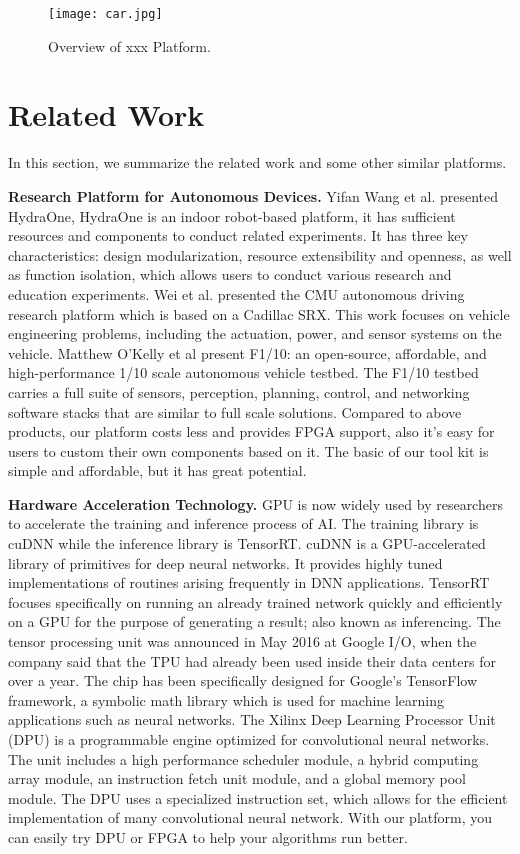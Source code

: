 \documentclass[conference]{IEEEtran}
\begin{document}
\begin{sloppypar}
\begin{figure}[htbp]
\centerline{\texttt{[image: car.jpg]}}
\caption{Overview of xxx Platform.}
\label{ov}
\end{figure}

\section{Related Work}

In this section, we summarize the related work and some other similar platforms.

\textbf{Research Platform for Autonomous Devices.} Yifan Wang et al. presented HydraOne\cite{b9}, HydraOne is an indoor robot-based platform, it has sufficient resources and components to conduct related experiments. It has three key characteristics: design modularization, resource extensibility and openness, as well as function isolation, which allows users to conduct various research and education experiments. Wei et al. presented the CMU autonomous driving research platform which is based on a Cadillac SRX\cite{b10}. This work focuses on vehicle engineering problems, including the actuation, power, and sensor systems on the vehicle. Matthew O’Kelly et al present F1/10\cite{b11}: an open-source, affordable, and high-performance 1/10 scale autonomous vehicle testbed. The F1/10 testbed carries a full suite of sensors, perception, planning, control, and networking software stacks that are similar to full scale solutions. Compared to above products, our platform costs less and provides FPGA support, also it's easy for users to custom their own components based on it. The basic of our tool kit is simple and affordable, but it has great potential.

\textbf{Hardware Acceleration Technology.} GPU\cite{b12} is now widely used by researchers to accelerate the training and inference process of AI. The training library is cuDNN\cite{b13} while the inference library is TensorRT\cite{b14}. cuDNN is a GPU-accelerated library of primitives for deep neural networks. It provides highly tuned implementations of routines arising frequently in DNN applications. TensorRT focuses specifically on running an already trained network quickly and efficiently on a GPU for the purpose of generating a result; also known as inferencing. The tensor processing unit was announced in May 2016 at Google I/O, when the company said that the TPU had already been used inside their data centers for over a year\cite{b15}. The chip has been specifically designed for Google's TensorFlow framework, a symbolic math library which is used for machine learning applications such as neural networks.\cite{b16} The Xilinx Deep Learning Processor Unit (DPU)\cite{b17} is a programmable engine optimized for convolutional neural networks. The unit includes a high performance scheduler module, a hybrid computing array module, an instruction fetch unit module, and a global memory pool module. The DPU uses a specialized instruction set, which allows for the efficient implementation of many convolutional neural network. With our platform, you can easily try DPU or FPGA to help your algorithms run better.


\end{sloppypar}
\end{document}

